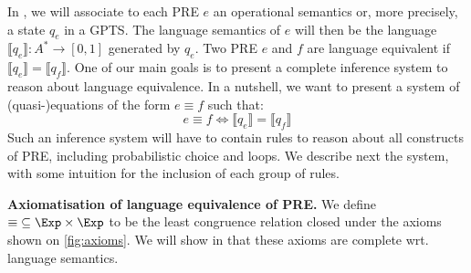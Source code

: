 In , we will associate to each {PRE} $e$ an operational semantics or, more precisely, a state $q_e$ in a {GPTS}. The language semantics of $e$ will then be the language $\llbracket q_e \rrbracket \colon A^* \to [0,1]$ generated by $q_e$. Two {PRE} $e$ and $f$ are language equivalent if $\llbracket q_e \rrbracket=\llbracket q_f \rrbracket$. One of our main goals is to present a complete inference system to reason about language equivalence. In a nutshell, we want to present a system of (quasi-)equations of the form $e\equiv f$ such that:
\[
e\equiv f \Leftrightarrow \llbracket q_e \rrbracket=\llbracket q_f \rrbracket
\]
Such an inference system will have to contain rules to reason about all constructs of {PRE}, including probabilistic choice and loops. We describe next the system, with some intuition for the inclusion of each group of rules. 

\vspace{2px}
\noindent
\textbf{Axiomatisation of language equivalence of {PRE}.} We define ${\equiv} \subseteq \Exp \times \Exp$ to be the least congruence relation closed under the axioms shown on \cref{fig:axioms}. We will show in  that these axioms are complete wrt. language semantics. 

